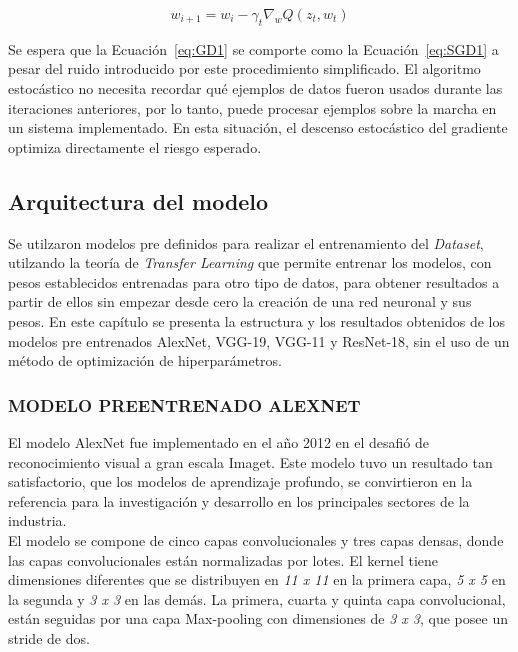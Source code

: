 			\begin{equation}
				\label{eq:SGD1}
				{w_{i+1}=w_i-\gamma_t\nabla_w Q(z_t,w_t)}
			\end{equation}
			
			Se espera que la Ecuación~\ref{eq:GD1} se comporte como la Ecuación~\ref{eq:SGD1} a pesar del ruido introducido por este procedimiento simplificado. El algoritmo estocástico no necesita recordar qué ejemplos de datos fueron usados durante las iteraciones anteriores, por lo tanto, puede procesar ejemplos sobre la marcha en un sistema implementado. En esta situación, el descenso estocástico del gradiente optimiza directamente el riesgo esperado.	
			
		\subsection{Arquitectura del modelo}
		
		Se utilzaron modelos pre definidos para realizar el entrenamiento del \textit{Dataset}, utilzando la teoría de \textit{Transfer Learning} que permite entrenar los modelos, con pesos establecidos entrenadas para otro tipo de datos, para obtener resultados a partir de ellos sin empezar desde cero la creación de una red neuronal y sus pesos. En este capítulo se presenta la estructura y los resultados obtenidos de los modelos pre entrenados AlexNet, VGG-19, VGG-11 y ResNet-18, sin el uso de un método de optimización de hiperparámetros.
		
			\subsubsection{\MakeUppercase{Modelo preentrenado ALEXNET}}
		
			El modelo AlexNet fue implementado en el año 2012 en el desafió de reconocimiento visual a gran escala Imaget. Este modelo tuvo un resultado tan satisfactorio, que los modelos de aprendizaje profundo, se convirtieron en la referencia para la investigación y desarrollo en los principales sectores de la industria. \cite{Pytorch}\\
			
			
			El modelo se compone de cinco capas convolucionales y tres capas densas, donde las capas convolucionales están normalizadas por lotes. El kernel tiene dimensiones diferentes que se distribuyen en \textit{11 x 11} en la primera capa, \textit{5 x 5} en la segunda y \textit{3 x 3} en las demás. La primera, cuarta y quinta capa convolucional, están seguidas por una capa Max-pooling con dimensiones de \textit{3 x 3}, que posee un stride de dos.\\
			
